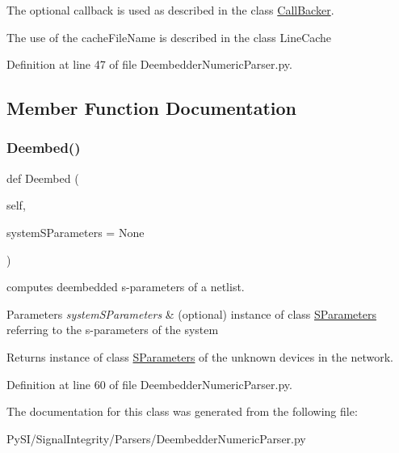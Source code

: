 The optional callback is used as described in the class \hyperlink{namespaceSignalIntegrity_1_1CallBacker}{Call\+Backer}.

The use of the cache\+File\+Name is described in the class Line\+Cache 

Definition at line 47 of file Deembedder\+Numeric\+Parser.\+py.



\subsection{Member Function Documentation}
\mbox{\label{classSignalIntegrity_1_1Parsers_1_1DeembedderNumericParser_1_1DeembedderNumericParser_aa04b7e5ad8ffcfb9ef4f6f1fd03594b3}} 
\subsubsection{\texorpdfstring{Deembed()}{Deembed()}}
{\footnotesize\ttfamily def Deembed (\begin{DoxyParamCaption}\item[{}]{self,  }\item[{}]{system\+S\+Parameters = {\ttfamily None} }\end{DoxyParamCaption})}



computes deembedded s-\/parameters of a netlist. 


\begin{DoxyParams}{Parameters}
{\em system\+S\+Parameters} & (optional) instance of class \hyperlink{namespaceSignalIntegrity_1_1SParameters}{S\+Parameters} referring to the s-\/parameters of the system \\
\hline
\end{DoxyParams}
\begin{DoxyReturn}{Returns}
instance of class \hyperlink{namespaceSignalIntegrity_1_1SParameters}{S\+Parameters} of the unknown devices in the network. 
\end{DoxyReturn}


Definition at line 60 of file Deembedder\+Numeric\+Parser.\+py.



The documentation for this class was generated from the following file\+:\begin{DoxyCompactItemize}
\item 
Py\+S\+I/\+Signal\+Integrity/\+Parsers/Deembedder\+Numeric\+Parser.\+py\end{DoxyCompactItemize}
